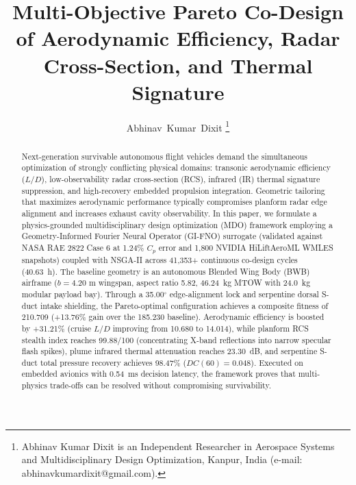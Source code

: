 \documentclass[journal,10pt,twocolumn]{IEEEtran}
\begin{document}
\title{Multi-Objective Pareto Co-Design of Aerodynamic Efficiency, Radar Cross-Section, and Thermal Signature}

\author{Abhinav~Kumar~Dixit%
\thanks{Abhinav Kumar Dixit is an Independent Researcher in Aerospace Systems and Multidisciplinary Design Optimization, Kanpur, India (e-mail: abhinavkumardixit@gmail.com).}}


\maketitle

\begin{abstract}
Next-generation survivable autonomous flight vehicles demand the simultaneous optimization of strongly conflicting physical domains: transonic aerodynamic efficiency ($L/D$), low-observability radar cross-section (RCS), infrared (IR) thermal signature suppression, and high-recovery embedded propulsion integration. Geometric tailoring that maximizes aerodynamic performance typically compromises planform radar edge alignment and increases exhaust cavity observability. In this paper, we formulate a physics-grounded multidisciplinary design optimization (MDO) framework employing a Geometry-Informed Fourier Neural Operator (GI-FNO) surrogate (validated against NASA RAE 2822 Case 6 at 1.24\% $C_p$ error and 1,800 NVIDIA HiLiftAeroML WMLES snapshots) coupled with NSGA-II across 41,353+ continuous co-design cycles (40.63~h). The baseline geometry is an autonomous Blended Wing Body (BWB) airframe ($b = 4.20\text{ m}$ wingspan, aspect ratio 5.82, 46.24~kg MTOW with 24.0~kg modular payload bay). Through a 35.00$^\circ$ edge-alignment lock and serpentine dorsal S-duct intake shielding, the Pareto-optimal configuration achieves a composite fitness of 210.709 (+13.76\% gain over the 185.230 baseline). Aerodynamic efficiency is boosted by +31.21\% (cruise $L/D$ improving from 10.680 to 14.014), while planform RCS stealth index reaches 99.88/100 (concentrating X-band reflections into narrow specular flash spikes), plume infrared thermal attenuation reaches 23.30~dB, and serpentine S-duct total pressure recovery achieves 98.47\% ($DC(60) = 0.048$). Executed on embedded avionics with 0.54~ms decision latency, the framework proves that multi-physics trade-offs can be resolved without compromising survivability.
\end{abstract}
\end{document}
